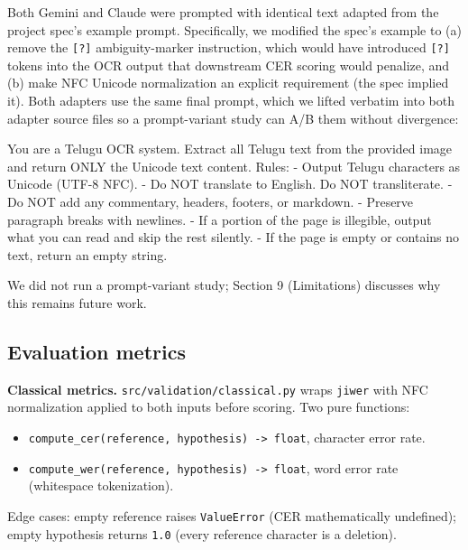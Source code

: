 \documentclass[
  letterpaper,
  DIV=11,
  numbers=noendperiod]{scrartcl}
\newenvironment{Shaded}{\begin{snugshade}}{\end{snugshade}}
\newcommand{\NormalTok}[1]{\textcolor[rgb]{0.00,0.23,0.31}{#1}}
\providecommand{\tightlist}{%
  \setlength{\itemsep}{0pt}\setlength{\parskip}{0pt}}
\begin{document}
Both Gemini and Claude were prompted with identical text adapted from
the project spec's example prompt. Specifically, we modified the spec's
example to (a) remove the \texttt{{[}?{]}} ambiguity-marker instruction,
which would have introduced \texttt{{[}?{]}} tokens into the OCR output
that downstream CER scoring would penalize, and (b) make NFC Unicode
normalization an explicit requirement (the spec implied it). Both
adapters use the same final prompt, which we lifted verbatim into both
adapter source files so a prompt-variant study can A/B them without
divergence:

\begin{Shaded}
\begin{Highlighting}[]
\NormalTok{You are a Telugu OCR system. Extract all Telugu text from the}
\NormalTok{provided image and return ONLY the Unicode text content. Rules:}
\NormalTok{{-} Output Telugu characters as Unicode (UTF{-}8 NFC).}
\NormalTok{{-} Do NOT translate to English. Do NOT transliterate.}
\NormalTok{{-} Do NOT add any commentary, headers, footers, or markdown.}
\NormalTok{{-} Preserve paragraph breaks with newlines.}
\NormalTok{{-} If a portion of the page is illegible, output what you can}
\NormalTok{  read and skip the rest silently.}
\NormalTok{{-} If the page is empty or contains no text, return an empty}
\NormalTok{  string.}
\end{Highlighting}
\end{Shaded}

We did not run a prompt-variant study; Section 9 (Limitations) discusses
why this remains future work.

\subsection{Evaluation metrics}\label{evaluation-metrics}

\textbf{Classical metrics.} \texttt{src/validation/classical.py} wraps
\texttt{jiwer} with NFC normalization applied to both inputs before
scoring. Two pure functions:

\begin{itemize}
\tightlist
\item
  \texttt{compute\_cer(reference,\ hypothesis)\ -\textgreater{}\ float},
  character error rate.
\item
  \texttt{compute\_wer(reference,\ hypothesis)\ -\textgreater{}\ float},
  word error rate (whitespace tokenization).
\end{itemize}

Edge cases: empty reference raises \texttt{ValueError} (CER
mathematically undefined); empty hypothesis returns \texttt{1.0} (every
reference character is a deletion).
\end{document}
